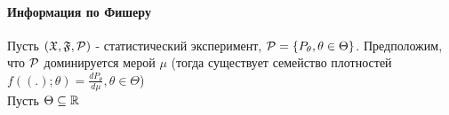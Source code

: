 \documentclass[main.tex]{subfiles}
\begin{document}
\paragraph{Информация по Фишеру}
Пусть $(\mathfrak{X},\mathfrak{F},\mathcal{P})$ - статистический эксперимент, $\mathcal{P}=\{P_\theta, \theta\in\Theta\}$. Предположим, что $\mathcal{P}$ доминируется мерой $\mu$ (тогда существует семейство плотностей $f((.);\theta)=\frac{dP_\theta}{d\mu}, \theta\in\Theta$)\\
Пусть $\Theta\subseteq\mathbb{R}$
\end{document}
